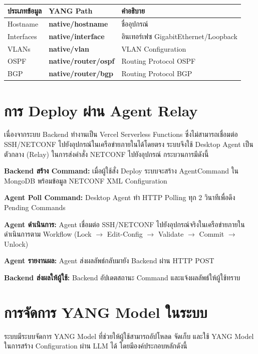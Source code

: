 \begin{table}[H]
\centering
\caption{}
\label{tabD:IosXeFilters}
\begin{tabularx}{\textwidth}{|l|l|X|}
\hline
\textbf{ประเภทข้อมูล} & \textbf{YANG Path} & \textbf{คำอธิบาย} \\
\hline
Hostname & \textbf{native/hostname} & ชื่ออุปกรณ์ \\
\hline
Interfaces & \textbf{native/interface} & อินเทอร์เฟซ GigabitEthernet/Loopback \\
\hline
VLANs & \textbf{native/vlan} & VLAN Configuration \\
\hline
OSPF & \textbf{native/router/ospf} & Routing Protocol OSPF \\
\hline
BGP & \textbf{native/router/bgp} & Routing Protocol BGP \\
\hline
\end{tabularx}
\end{table}

\section{การ Deploy ผ่าน Agent Relay}
\hspace*{1.3em}
เนื่องจากระบบ Backend ทำงานเป็น Vercel Serverless Functions ซึ่งไม่สามารถเชื่อมต่อ SSH/NETCONF ไปยังอุปกรณ์ในเครือข่ายภายในได้โดยตรง ระบบจึงใช้ Desktop Agent เป็นตัวกลาง (Relay) ในการส่งคำสั่ง NETCONF ไปยังอุปกรณ์ กระบวนการมีดังนี้

\begin{mycustomenum2}
    \item \textbf{Backend สร้าง Command:} เมื่อผู้ใช้สั่ง Deploy ระบบจะสร้าง AgentCommand ใน MongoDB พร้อมข้อมูล NETCONF XML Configuration
    \item \textbf{Agent Poll Command:} Desktop Agent ทำ HTTP Polling ทุก 2 วินาทีเพื่อดึง Pending Commands
    \item \textbf{Agent ดำเนินการ:} Agent เชื่อมต่อ SSH/NETCONF ไปยังอุปกรณ์จริงในเครือข่ายภายใน ดำเนินการตาม Workflow (Lock $\rightarrow$ Edit-Config $\rightarrow$ Validate $\rightarrow$ Commit $\rightarrow$ Unlock)
    \item \textbf{Agent รายงานผล:} Agent ส่งผลลัพธ์กลับมายัง Backend ผ่าน HTTP POST
    \item \textbf{Backend ส่งผลให้ผู้ใช้:} Backend อัปเดตสถานะ Command และแจ้งผลลัพธ์ให้ผู้ใช้ทราบ
\end{mycustomenum2}

\section{การจัดการ YANG Model ในระบบ}
\hspace*{1.3em}
ระบบมีระบบจัดการ YANG Model ที่ช่วยให้ผู้ใช้สามารถอัปโหลด จัดเก็บ และใช้ YANG Model ในการสร้าง Configuration ผ่าน LLM ได้ โดยมีองค์ประกอบหลักดังนี้

